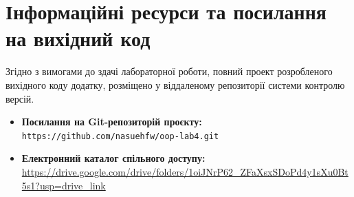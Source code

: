 \section{Інформаційні ресурси та посилання на вихідний код}

Згідно з вимогами до здачі лабораторної роботи, повний проект розробленого вихідного коду   
додатку, розміщено у віддаленому репозиторії системи контролю версій. 

\begin{itemize}
    \item \textbf{Посилання на Git-репозиторій проєкту:} \\
    \texttt{https://github.com/nasuehfw/oop-lab4.git} %
    \item \textbf{Електронний каталог спільного доступу:} \\
    \url{https://drive.google.com/drive/folders/1oiJNrP62_ZFaXsxSDoPd4y1sXu0Bt5s1?usp=drive_link} 
\end{itemize}

